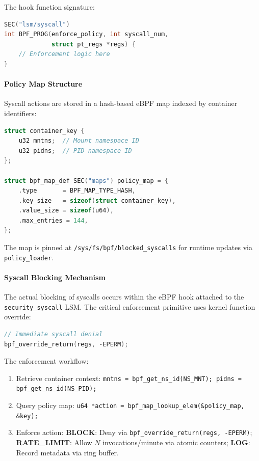 The hook function signature:
\begin{lstlisting}[float=htbp, language=C, caption={LSM hook function signature.}]
SEC("lsm/syscall")
int BPF_PROG(enforce_policy, int syscall_num,
             struct pt_regs *regs) {
    // Enforcement logic here
}
\end{lstlisting}

\paragraph{Policy Map Structure}
Syscall actions are stored in a hash-based eBPF map indexed by container identifiers:

\begin{lstlisting}[float=htbp, language=C, caption={Container-keyed eBPF policy map.}]
struct container_key {
    u32 mntns;  // Mount namespace ID
    u32 pidns;  // PID namespace ID
};

struct bpf_map_def SEC("maps") policy_map = {
    .type       = BPF_MAP_TYPE_HASH,
    .key_size   = sizeof(struct container_key),
    .value_size = sizeof(u64),
    .max_entries = 144,
};
\end{lstlisting}

The map is pinned at \texttt{/sys/fs/bpf/blocked\_syscalls} for runtime updates via
\texttt{policy\_loader}.

\paragraph{Syscall Blocking Mechanism}
The actual blocking of syscalls occurs within the eBPF hook attached to the
\texttt{security\_syscall} LSM. The critical enforcement primitive uses kernel function override:
\begin{lstlisting}[float=htbp, language=C, caption={Syscall blocking via kernel function override.}]
// Immediate syscall denial
bpf_override_return(regs, -EPERM);
\end{lstlisting}

The enforcement workflow:
\begin{enumerate}
  \item Retrieve container context: \texttt{mntns = bpf\_get\_ns\_id(NS\_MNT);
        pidns = bpf\_get\_ns\_id(NS\_PID);}
  \item Query policy map: \texttt{u64 *action = bpf\_map\_lookup\_elem(\&policy\_map, \&key);}
  \item Enforce action:
        \textbf{BLOCK}: Deny via \texttt{bpf\_override\_return(regs, -EPERM)};
        \textbf{RATE\_LIMIT}: Allow $N$ invocations/minute via atomic counters;
        \textbf{LOG}: Record metadata via ring buffer.
\end{enumerate}

